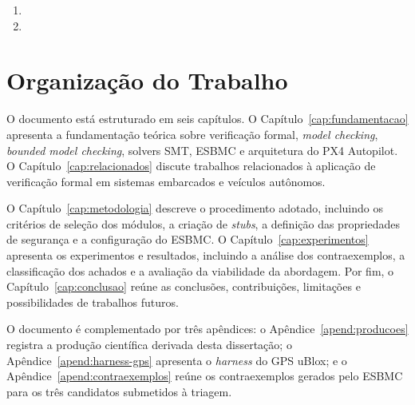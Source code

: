 \begin{enumerate}
\item {}

\item {}

\end{enumerate}

\section{Organização do Trabalho}
\label{sec:organizacao}

O documento está estruturado em seis capítulos. O Capítulo~\ref{cap:fundamentacao} apresenta a fundamentação teórica sobre verificação formal, \textit{model checking}, \textit{bounded model checking}, solvers SMT, ESBMC e arquitetura do PX4 Autopilot. O Capítulo~\ref{cap:relacionados} discute trabalhos relacionados à aplicação de verificação formal em sistemas embarcados e veículos autônomos.

O Capítulo~\ref{cap:metodologia} descreve o procedimento adotado, incluindo os critérios de seleção dos módulos, a criação de \textit{stubs}, a definição das propriedades de segurança e a configuração do ESBMC. O Capítulo~\ref{cap:experimentos} apresenta os experimentos e resultados, incluindo a análise dos contraexemplos, a classificação dos achados e a avaliação da viabilidade da abordagem. Por fim, o Capítulo~\ref{cap:conclusao} reúne as conclusões, contribuições, limitações e possibilidades de trabalhos futuros.

O documento é complementado por três apêndices: o Apêndice~\ref{apend:producoes} registra a produção científica derivada desta dissertação; o Apêndice~\ref{apend:harness-gps} apresenta o \textit{harness} do GPS uBlox; e o Apêndice~\ref{apend:contraexemplos} reúne os contraexemplos gerados pelo ESBMC para os três candidatos submetidos à triagem.
